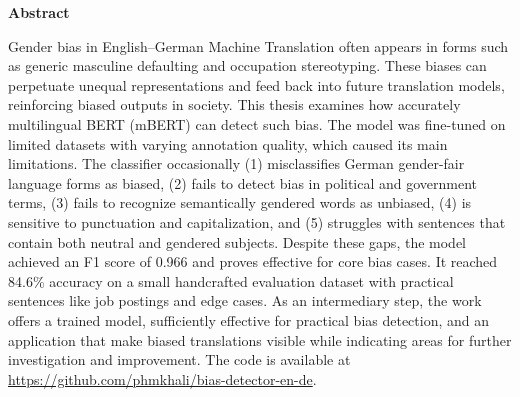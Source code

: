 \thispagestyle{empty}


\vspace*{1cm}

\begin{center}
    \textbf{Abstract}
\end{center}

\vspace*{1cm}

\noindent 
Gender bias in English–German Machine Translation often appears in forms such as generic masculine defaulting and occupation stereotyping. These biases can perpetuate unequal representations and feed back into future translation models, reinforcing biased outputs in society. This thesis examines how accurately multilingual BERT (mBERT) can detect such bias. The model was fine-tuned on limited datasets with varying annotation quality, which caused its main limitations. The classifier occasionally (1) misclassifies German gender-fair language forms as biased, (2) fails to detect bias in political and government terms, (3) fails to recognize semantically gendered words as unbiased, (4) is sensitive to punctuation and capitalization, and (5) struggles with sentences that contain both neutral and gendered subjects. Despite these gaps, the model achieved an F1 score of 0.966 and proves effective for core bias cases. It reached 84.6\% accuracy on a small handcrafted evaluation dataset with practical sentences like job postings and edge cases. As an intermediary step, the work offers a trained model, sufficiently effective for practical bias detection, and an application that make biased translations visible while indicating areas for further investigation and improvement. The code is available at \url{https://github.com/phmkhali/bias-detector-en-de}.